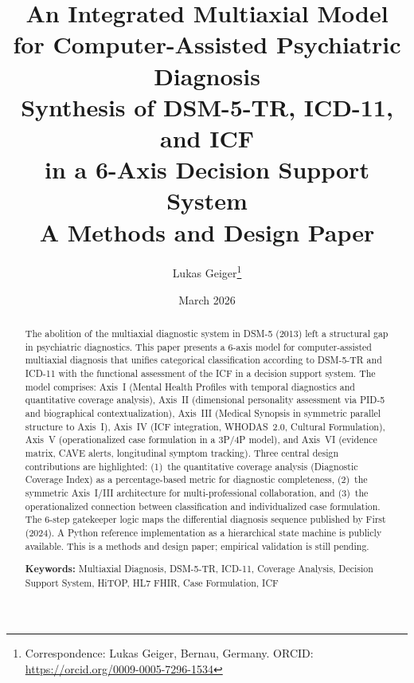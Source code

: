 \documentclass[11pt,a4paper]{article}
\begin{document}
\title{\textbf{\huge An Integrated Multiaxial Model\\for Computer-Assisted Psychiatric Diagnosis}\\[0.5em]
\Large Synthesis of DSM-5-TR, ICD-11, and ICF\\in a 6-Axis Decision Support System\\[0.3em]
\large A Methods and Design Paper}

\author[1]{Lukas Geiger\thanks{Correspondence: Lukas Geiger, Bernau, Germany. ORCID: \url{https://orcid.org/0009-0005-7296-1534}}}

\date{March 2026}

\maketitle

\begin{abstract}
\noindent The abolition of the multiaxial diagnostic system in DSM-5 (2013) left a structural gap in psychiatric diagnostics. This paper presents a 6-axis model for computer-assisted multiaxial diagnosis that unifies categorical classification according to DSM-5-TR and ICD-11 with the functional assessment of the ICF in a decision support system. The model comprises: Axis~I (Mental Health Profiles with temporal diagnostics and quantitative coverage analysis), Axis~II (dimensional personality assessment via PID-5 and biographical contextualization), Axis~III (Medical Synopsis in symmetric parallel structure to Axis~I), Axis~IV (ICF integration, WHODAS~2.0, Cultural Formulation), Axis~V (operationalized case formulation in a 3P/4P model), and Axis~VI (evidence matrix, CAVE alerts, longitudinal symptom tracking). Three central design contributions are highlighted: (1)~the quantitative coverage analysis (Diagnostic Coverage Index) as a percentage-based metric for diagnostic completeness, (2)~the symmetric Axis~I/III architecture for multi-professional collaboration, and (3)~the operationalized connection between classification and individualized case formulation. The 6-step gatekeeper logic maps the differential diagnosis sequence published by First (2024). A Python reference implementation as a hierarchical state machine is publicly available. This is a methods and design paper; empirical validation is still pending.

\vspace{0.5em}
\noindent \textbf{Keywords:} Multiaxial Diagnosis, DSM-5-TR, ICD-11, Coverage Analysis, Decision Support System, HiTOP, HL7 FHIR, Case Formulation, ICF
\end{abstract}
\end{document}
